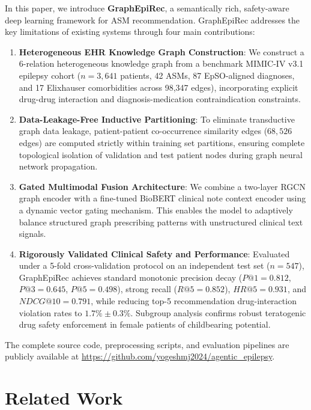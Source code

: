 \documentclass[11pt,a4paper]{article}
\begin{document}
In this paper, we introduce \textbf{GraphEpiRec}, a semantically rich, safety-aware deep learning framework for ASM recommendation. GraphEpiRec addresses the key limitations of existing systems through four main contributions:
\begin{enumerate}[leftmargin=*]
    \item \textbf{Heterogeneous EHR Knowledge Graph Construction}: We construct a 6-relation heterogeneous knowledge graph from a benchmark MIMIC-IV v3.1 epilepsy cohort ($n=3,641$ patients, 42 ASMs, 87 EpSO-aligned diagnoses, and 17 Elixhauser comorbidities across 98,347 edges), incorporating explicit drug-drug interaction and diagnosis-medication contraindication constraints.
    \item \textbf{Data-Leakage-Free Inductive Partitioning}: To eliminate transductive graph data leakage, patient-patient co-occurrence similarity edges ($68,526$ edges) are computed strictly within training set partitions, ensuring complete topological isolation of validation and test patient nodes during graph neural network propagation.
    \item \textbf{Gated Multimodal Fusion Architecture}: We combine a two-layer RGCN graph encoder with a fine-tuned BioBERT clinical note context encoder using a dynamic vector gating mechanism. This enables the model to adaptively balance structured graph prescribing patterns with unstructured clinical text signals.
    \item \textbf{Rigorously Validated Clinical Safety and Performance}: Evaluated under a 5-fold cross-validation protocol on an independent test set ($n=547$), GraphEpiRec achieves standard monotonic precision decay ($P@1=0.812$, $P@3=0.645$, $P@5=0.498$), strong recall ($R@5=0.852$), $HR@5=0.931$, and $NDCG@10=0.791$, while reducing top-5 recommendation drug-interaction violation rates to $1.7\% \pm 0.3\%$. Subgroup analysis confirms robust teratogenic drug safety enforcement in female patients of childbearing potential.
\end{enumerate}

The complete source code, preprocessing scripts, and evaluation pipelines are publicly available at \url{https://github.com/yogeshmj2024/agentic_epilepsy}.

\section{Related Work}
\end{document}
